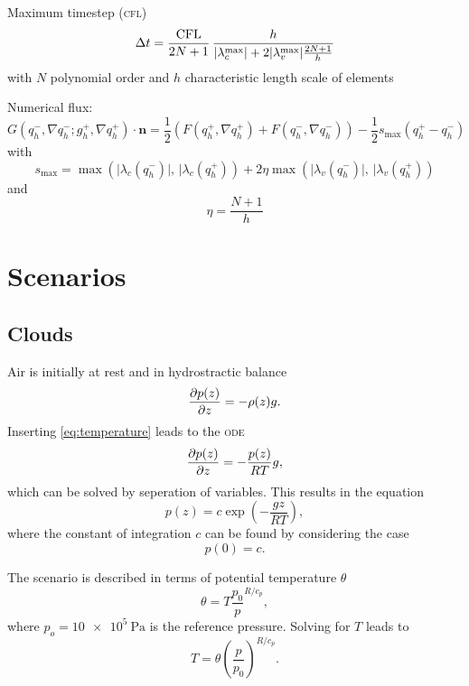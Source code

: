 Maximum timestep (\textsc{cfl})
\begin{equation}
 \Delta t = \frac{\text{CFL}}{2N + 1} \, \frac{h}{\vert \lambda_c^{\text{max}} \vert + 2 \vert \lambda_v^{\text{max}} \vert \frac{2N+1}{h}}
\end{equation}
with $N$ polynomial order and $h$ characteristic length scale of elements

Numerical flux:
\begin{equation}
  \label{eq:rusanov-flux}
  G(q_h^-, \nabla q_h^-; g_h^+, \nabla q_h^+) \cdot \bm{n} =
  \frac{1}{2} \left(
    F(q_h^+, \nabla q_h^+) +
    F(q_h^-, \nabla q_h^-)
  \right) -
  \frac{1}{2} s_\text{max} (q_h^+ - q_h^-)
\end{equation}
with
\begin{equation}
  \label{eq:parabolic-penalty}
  s_\text{max}  = \max \left(
\vert \lambda_c(q_h^-) \vert, \, \vert \lambda_c(q_h^+)
\right) +
2 \eta \max \left(
\vert \lambda_v(q_h^-) \vert, \, \vert \lambda_v(q_h^+)
\right)
\end{equation}
and
\begin{equation}
  \eta = \frac{N+1}{h}
\end{equation}


\section{Scenarios}
\label{sec:scenarios}

\subsection{Clouds}
Air is initially at rest and in hydrostractic balance
\begin{equation}
  \label{eq:hydrostatic-balance}
 \pdv{p (z)}{z} = -\rho(z) g.
\end{equation}
Inserting \cref{eq:temperature} leads to the \textsc{ode}
\begin{equation}
  \pdv{p(z)}{z} = - \frac{p(z)}{RT} g,
\end{equation}
which can be solved by seperation of variables.
This results in the equation
\begin{equation}
  \label{eq:bubble-pressure}
  p(z) = c \exp \left( - \frac{gz}{RT} \right),
\end{equation}
where the constant of integration $c$ can be found by considering the case
\begin{equation}
  p(0) = c.
\end{equation}

The scenario is described in terms of potential temperature $\theta$
\begin{equation}
  \theta = T \frac{p_0}{p}^{R/c_p},
\end{equation}
where $p_o = \SI{10e5}{\Pa}$ is the reference pressure.
Solving for $T$ leads to
\begin{equation}
  T = \theta (\frac{p}{p_0})^{R/c_p}.
\end{equation}

